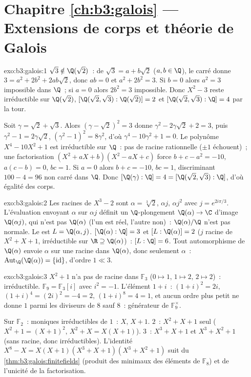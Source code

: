\section*{Chapitre \ref{ch:b3:galois} --- Extensions de corps et
théorie de Galois}

\begin{solution}{exo:b3:galois:1}
$\sqrt3 \notin \Q(\sqrt2)$~: de $\sqrt3 = a + b\sqrt2$ ($a, b
\in \Q$), le carré donne $3 = a^2 + 2b^2 + 2ab\sqrt2$, donc $ab
= 0$ et $a^2 + 2b^2 = 3$. Si $b = 0$ alors $a^2 = 3$ impossible
dans $\Q$~; si $a = 0$ alors $2b^2 = 3$ impossible. Donc $X^2 -
3$ reste irréductible sur $\Q(\sqrt2)$, $[\Q(\sqrt2,
\sqrt3):\Q(\sqrt2)] = 2$ et $[\Q(\sqrt2, \sqrt3):\Q] = 4$ par la
tour.

Soit $\gamma = \sqrt2 + \sqrt3$. Alors $(\gamma - \sqrt2)^2 =
3$ donne $\gamma^2 - 2\gamma\sqrt2 + 2 = 3$, puis $\gamma^2 - 1
= 2\gamma\sqrt2$, $(\gamma^2 - 1)^2 = 8\gamma^2$, d'où $\gamma^4
- 10\gamma^2 + 1 = 0$. Le polynôme $X^4 - 10X^2 + 1$ est
irréductible sur $\Q$~: pas de racine rationnelle ($\pm1$
échouent)~; une factorisation $(X^2 + aX + b)(X^2 - aX + c)$
force $b + c - a^2 = -10$, $a(c-b) = 0$, $bc = 1$. Si $a = 0$
alors $b + c = -10$, $bc = 1$, discriminant $100 - 4 = 96$ non
carré dans $\Q$. Donc $[\Q(\gamma):\Q] = 4 =
[\Q(\sqrt2,\sqrt3):\Q]$, d'où égalité des corps.
\end{solution}

\begin{solution}{exo:b3:galois:2}
Les racines de $X^3 - 2$ sont $\alpha = \sqrt[3]{2}$, $\alpha
j$, $\alpha j^2$ avec $j = e^{2i\pi/3}$. L'évaluation envoyant
$\alpha$ sur $\alpha j$ définit un $\Q$-plongement $\Q(\alpha)
\to \C$ d'image $\Q(\alpha j)$, qui n'est pas $\Q(\alpha)$
(l'un est réel, l'autre non)~: $\Q(\alpha)/\Q$ n'est pas
normale. Le  est $L = \Q(\alpha, j)$.
$[\Q(\alpha):\Q] = 3$ et $[L:\Q(\alpha)] = 2$ ($j$ racine de
$X^2 + X + 1$, irréductible sur $\R \supseteq \Q(\alpha)$)~:
$[L:\Q] = 6$. Tout automorphisme de $\Q(\alpha)$ envoie
$\alpha$ sur une racine dans $\Q(\alpha)$, donc seulement
$\alpha$~: $\operatorname{Aut}_\Q(\Q(\alpha)) =
\{\mathrm{id}\}$, d'ordre $1 \ll 3$.
\end{solution}

\begin{solution}{exo:b3:galois:3}
$X^2 + 1$ n'a pas de racine dans $\mathbb F_3$ ($0\mapsto1$,
$1\mapsto2$, $2\mapsto2$)~: irréductible. $\mathbb F_9 =
\mathbb F_3[i]$ avec $i^2 = -1$. L'élément $1+i$~: $(1+i)^2 =
2i$, $(1+i)^4 = (2i)^2 = -4 = 2$, $(1+i)^8 = 4 = 1$, et aucun
ordre plus petit ne donne $1$ parmi les diviseurs de $8$ sauf
$8$~: générateur de $\mathbb F_9^\times$.

Sur $\mathbb F_2$~: moniques irréductibles de  $1$~: $X$,
$X+1$.  $2$~: $X^2+X+1$ seul ($X^2+1=(X+1)^2$,
$X^2+X=X(X+1)$).  $3$~: $X^3+X+1$ et $X^3+X^2+1$ (sans
racine, donc irréductibles). L'identité $X^8 - X =
X(X+1)(X^3+X+1)(X^3+X^2+1)$ suit du
\cref{thm:b3:galois:finitefields} (produit des minimaux des
éléments de $\mathbb F_8$) et de l'unicité de la
factorisation.
\end{solution}


